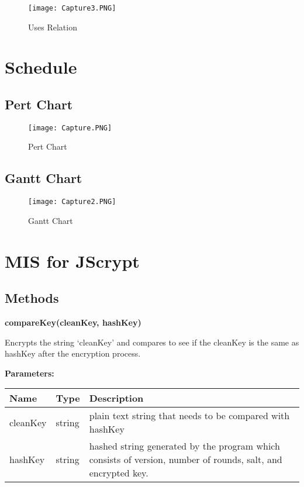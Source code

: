 \documentclass[12pt]{article}
\begin{document}
	\begin{figure}[H]

	\centerline{\texttt{[image: Capture3.PNG]}}
	\caption{Uses Relation}
	\end{figure}


\section{Schedule}

\subsection{Pert Chart}


	\begin{figure}[H]
	\centerline{\texttt{[image: Capture.PNG]}}
	\caption{Pert Chart}
	\end{figure}

\subsection{Gantt Chart}

	\begin{figure}[H]
	\centerline{\texttt{[image: Capture2.PNG]}}
	\caption{Gantt Chart}
	\end{figure}


\textcolor{red}{}
 \section{MIS for JScrypt}

 \subsection{Methods}

\textbf{compareKey(cleanKey, hashKey)}

Encrypts the string `cleanKey' and compares to see if the cleanKey is the same as hashKey after the encryption process.

\textbf{Parameters:}

\begin{table}[H]
\centering
\label{tab:table2}
      \begin{tabular}{ | p{4cm} | p{4cm} | p{9cm} | }
        \hline
            \textbf{Name} & \textbf{Type} & \textbf{Description} \\
        \hline
          cleanKey & string & plain text string that needs to be compared with hashKey  \\
        \hline
          hashKey & string & hashed string generated by the program which consists of version, number of rounds, salt, and encrypted key. \\
       \hline
      \end{tabular}
  \end{table}
\end{document}
